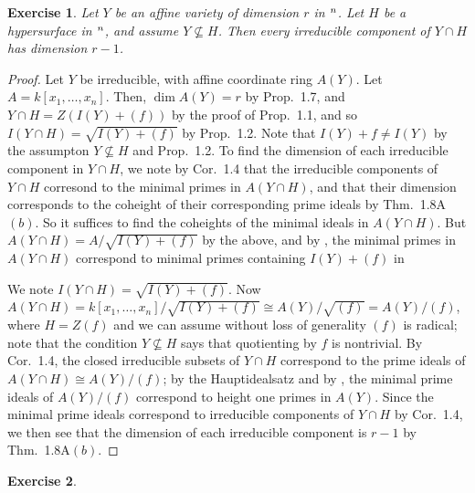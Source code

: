 \documentclass[12pt,letterpaper]{article}
\newtheorem{problem}{Exercise}[section]
\theoremstyle{definition}
\theoremstyle{remark}
\numberwithin{equation}{section}
\numberwithin{figure}{problem}
\let\AA\relax
\DeclareMathOperator{\AA}{\mathbb{A}}
\begin{document}
\begin{problem}
  Let $Y$ be an affine variety of dimension $r$ in $\AA^n$.
  Let $H$ be a hypersurface in $\AA^n$, and assume $Y \not\subseteq H$.
  Then every irreducible component of $Y \cap H$ has dimension $r-1$.
\end{problem}
\begin{proof}
  Let $Y$ be irreducible, with affine coordinate ring $A(Y)$.
  Let $A = k[x_1,\ldots,x_n]$.
  Then, $\dim A(Y) = r$ by Prop.~1.7, and $Y \cap H = Z(I(Y) + (f))$ by the
  proof of Prop.~1.1, and so $I(Y \cap H) = \sqrt{I(Y) + (f)}$ by Prop.~1.2.
  Note that $I(Y) + f \ne I(Y)$ by the assumpton $Y \not\subseteq H$ and
  Prop.~1.2.
  To find the dimension of each irreducible component in $Y \cap H$, we note by
  Cor.~1.4 that the irreducible components of $Y \cap H$ corresond to the
  minimal primes in $A(Y \cap H)$, and that their dimension corresponds to the
  coheight of their corresponding prime ideals by Thm.~1.8A$(b)$.
  So it suffices to find the coheights of the minimal ideals in $A(Y \cap H)$.
  But $A(Y \cap H) = A/\sqrt{I(Y) + (f)}$ by the above, and by
  \cite[Prop.~1.1]{AM69}, the minimal primes in $A(Y \cap H)$ correspond to
  minimal primes containing $I(Y) + (f)$ in 

  We note $I(Y \cap H) = \sqrt{I(Y) + (f)}$.
  Now $A(Y \cap H) = k[x_1,\ldots,x_n]/\sqrt{I(Y) + (f)} \cong
  A(Y)/\sqrt{(f)} = A(Y)/(f)$, where $H = Z(f)$ and we can assume without
  loss of generality $(f)$ is radical; note that the condition $Y
  \not\subseteq H$ says that quotienting by $f$ is nontrivial.
  By Cor.~1.4, the closed irreducible subsets of $Y \cap H$ correspond to the
  prime ideals of $A(Y \cap H) \cong A(Y)/(f)$; by the Hauptidealsatz and by
  \cite[Prop.~1.1]{AM69}, the minimal prime ideals of $A(Y)/(f)$ correspond to
  height one primes in $A(Y)$.
  Since the minimal prime ideals correspond to irreducible components of $Y \cap
  H$ by Cor.~1.4, we then see that the dimension of each irreducible component
  is $r-1$ by Thm.~1.8A$(b)$.
\end{proof}

\begin{problem}
\end{problem}
\end{document}
